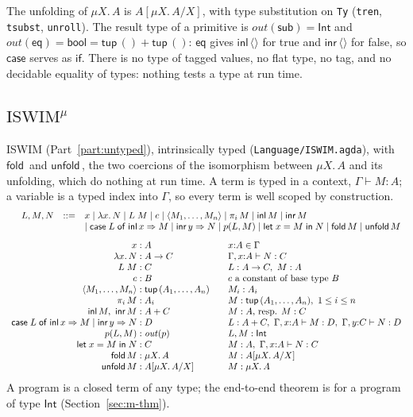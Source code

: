 \documentclass[10pt]{article}
\makeatletter
\theoremstyle{acmplain}
\newcommand{\key}[1]{\mathsf{#1}}
\newcommand{\lam}[1]{\lambda #1.\,}
\newcommand{\Let}{\key{let}\;}
\newcommand{\In}{\;\key{in}\;}
\newcommand{\inl}{\key{inl}\,}
\newcommand{\inr}{\key{inr}\,}
\newcommand{\Case}[5]{\key{case}\;#1\;\key{of}\;\key{inl}\,#2 \Rightarrow #3 \mid \key{inr}\,#4 \Rightarrow #5}
\newcommand{\tuple}[1]{\langle #1 \rangle}
\newcommand{\prj}[1]{\pi_{#1}\,}
\newcommand{\emptytup}{\langle\rangle}
\newcommand{\prim}[3]{#1(#2, #3)}
\newcommand{\Tout}[1]{\mathit{out}(#1)}        %
\newcommand{\Ml}[1]{\textrm{#1}^{\mu}}                  %
\newcommand{\Mmu}[2]{\mu #1.\,#2}                         %
\newcommand{\Mtup}[1]{\key{tup}\,#1}                      %
\newcommand{\Munroll}[2]{#2[\mu #1.\,#2/#1]}              %
\newcommand{\Mbool}{\key{bool}}                           %
\newcommand{\Mfold}{\key{fold}\,}
\newcommand{\Munfold}{\key{unfold}\,}
\newenvironment{syntax}{\[\begin{array}{l@{\quad}rcl}}{\end{array}\]}
\makeatother
\begin{document}
The unfolding of $\Mmu{X}{A}$ is $\Munroll{X}{A}$, with type substitution
on \texttt{Ty} (\texttt{tren}, \texttt{tsubst}, \texttt{unroll}). The
result type of a primitive is $\Tout{\key{sub}} = \key{Int}$ and
$\Tout{\key{eq}} = \Mbool = \Mtup{()} + \Mtup{()}$: $\key{eq}$ gives
$\inl\emptytup$ for true and $\inr\emptytup$ for false, so $\key{case}$
serves as $\key{if}$. There is no type of tagged values, no flat type, no
tag, and no decidable equality of types: nothing tests a type at run
time.

\subsection{\texorpdfstring{$\Ml{ISWIM}$}{ISWIM-mu}}\label{sec:m-iswim}

ISWIM (Part~\ref{part:untyped}), intrinsically typed
(\texttt{Language/ISWIM.agda}), with $\Mfold$ and $\Munfold$, the two
coercions of the isomorphism between $\Mmu{X}{A}$ and its unfolding,
which do nothing at run time. A term is typed in a context,
$\Gamma \vdash M : A$; a variable is a typed index into $\Gamma$, so every
term is well scoped by construction.
\begin{syntax}
  & L, M, N &::=& x \mid \lam{x} N \mid L\;M \mid c
    \mid \tuple{M_1,\ldots,M_n} \mid \prj{i} M
    \mid \inl M \mid \inr M \\
  &&& \mid \Case{L}{x}{M}{y}{N} \mid \prim{p}{L}{M}
    \mid \Let x = M \In N
    \mid \Mfold M \mid \Munfold M
\end{syntax}
\[
\begin{array}{r@{\;:\;}l@{\qquad}l}
  x & A & x{:}A \in \Gamma \\
  \lam{x} N & A \rightarrow C & \Gamma, x{:}A \vdash N : C \\
  L\;M & C & L : A \rightarrow C,\ M : A \\
  c & B & c \text{ a constant of base type } B \\
  \tuple{M_1,\ldots,M_n} & \Mtup{(A_1, \ldots, A_n)} & M_i : A_i \\
  \prj{i} M & A_i & M : \Mtup{(A_1, \ldots, A_n)},\ 1 \leq i \leq n \\
  \inl M,\ \inr M & A + C & M : A \text{, resp. } M : C \\
  \Case{L}{x}{M}{y}{N} & D & L : A + C,\ \Gamma, x{:}A \vdash M : D,\ \Gamma, y{:}C \vdash N : D \\
  \prim{p}{L}{M} & \Tout{p} & L, M : \key{Int} \\
  \Let x = M \In N & C & M : A,\ \Gamma, x{:}A \vdash N : C \\
  \Mfold M & \Mmu{X}{A} & M : \Munroll{X}{A} \\
  \Munfold M & \Munroll{X}{A} & M : \Mmu{X}{A}
\end{array}
\]
A program is a closed term of any type; the end-to-end theorem is for a
program of type $\key{Int}$ (Section~\ref{sec:m-thm}).
\end{document}
